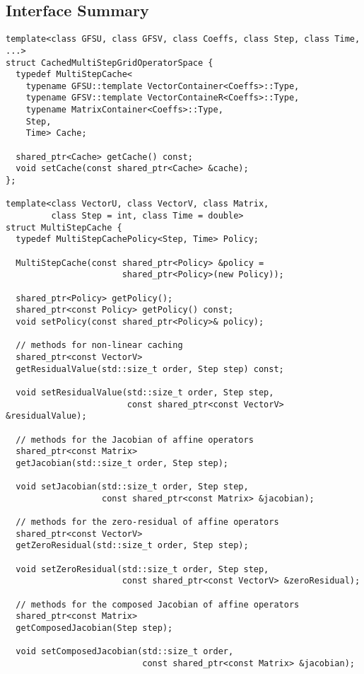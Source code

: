 \documentclass[11pt,a4paper,DIV11,%
notitlepage,oneside,abstracton,%
bibtotoc]{scrartcl}
\begin{document}
\subsection{Interface Summary}

\begin{lstlisting}
template<class GFSU, class GFSV, class Coeffs, class Step, class Time, ...>
struct CachedMultiStepGridOperatorSpace {
  typedef MultiStepCache<
    typename GFSU::template VectorContainer<Coeffs>::Type,
    typename GFSV::template VectorContaineR<Coeffs>::Type,
    typename MatrixContainer<Coeffs>::Type,
    Step,
    Time> Cache;

  shared_ptr<Cache> getCache() const;
  void setCache(const shared_ptr<Cache> &cache);
};

template<class VectorU, class VectorV, class Matrix,
         class Step = int, class Time = double>
struct MultiStepCache {
  typedef MultiStepCachePolicy<Step, Time> Policy;

  MultiStepCache(const shared_ptr<Policy> &policy =
                       shared_ptr<Policy>(new Policy));

  shared_ptr<Policy> getPolicy();
  shared_ptr<const Policy> getPolicy() const;
  void setPolicy(const shared_ptr<Policy>& policy);

  // methods for non-linear caching
  shared_ptr<const VectorV>
  getResidualValue(std::size_t order, Step step) const;

  void setResidualValue(std::size_t order, Step step,
                        const shared_ptr<const VectorV> &residualValue);

  // methods for the Jacobian of affine operators
  shared_ptr<const Matrix>
  getJacobian(std::size_t order, Step step);

  void setJacobian(std::size_t order, Step step,
                   const shared_ptr<const Matrix> &jacobian);

  // methods for the zero-residual of affine operators
  shared_ptr<const VectorV>
  getZeroResidual(std::size_t order, Step step);

  void setZeroResidual(std::size_t order, Step step,
                       const shared_ptr<const VectorV> &zeroResidual);

  // methods for the composed Jacobian of affine operators
  shared_ptr<const Matrix>
  getComposedJacobian(Step step);

  void setComposedJacobian(std::size_t order,
                           const shared_ptr<const Matrix> &jacobian);


\end{lstlisting}
\end{document}
